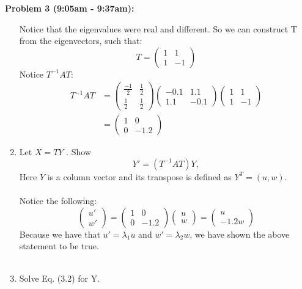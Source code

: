 \documentclass[11pt]{article}
\newenvironment{problem}[1]{\textbf{Problem #1: }}{\newpage}
\begin{document}
\begin{problem}{3 (9:05am - 9:37am)}
\begin{enumerate}[label = (\alph*)]
			Notice that the eigenvalues were real and different.  So we can construct T from the eigenvectors, such that:
			\[T = \begin{pmatrix}
				1 & 1 \\
				1 & -1
			\end{pmatrix}\]
			Notice $T^{-1}AT$:
			\begin{align*}
				T^{-1}AT &= \begin{pmatrix}
					\frac{-1}{2} & \frac{1}{2} \\
					\frac{1}{2} & \frac{1}{2}
				\end{pmatrix}
				\begin{pmatrix}
					-0.1 & 1.1 \\
					1.1 & -0.1
				\end{pmatrix}\begin{pmatrix}
					1 & 1 \\
					1 & -1
				\end{pmatrix} \\
				&= 
				\begin{pmatrix}
					1 & 0 \\
					0 & -1.2
				\end{pmatrix}
			\end{align*}
			\newpage
			\item Let $X = T Y$ . Show
			\[Y' = (T^{-1}AT)Y,\tag{3.2}\]
			Here $Y$ is a column vector and its transpose is defined as $Y^T = (u, w)$. 
			\\ \\
			Notice the following:
			\[\begin{pmatrix}
				u' \\ w'
			\end{pmatrix} = \begin{pmatrix}
				1 & 0 \\
				0 & -1.2
			\end{pmatrix}\begin{pmatrix}
				u \\ w
			\end{pmatrix} = \begin{pmatrix}
				u \\ -1.2w
			\end{pmatrix}\]
			Because we have that $u' = \lambda_1 u $ and $w' =\lambda_2 w$, we have shown the above statement to be true.
			\\ \\
			\item Solve Eq. (3.2) for Y.
			\\ \\

\end{enumerate}
\end{problem}
\end{document}
